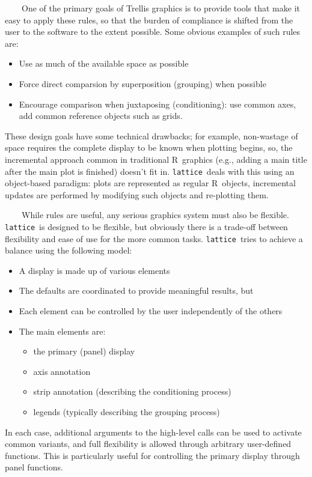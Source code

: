 \documentclass[10pt]{article}
\newcommand{\R}{\textsf{R}}
\newcommand{\code}[1]{\texttt{#1}}
\newcommand{\lattice}{\code{lattice}}
\begin{document}
~~~~One of the primary goals of Trellis graphics is to provide tools
that make it easy to apply these rules, so that the burden of
compliance is shifted from the user to the software to the extent
possible.  Some obvious examples of such rules are:
\begin{itemize}
\item Use as much of the available space as possible
\item Force direct comparsion by superposition (grouping) when
  possible
\item Encourage comparison when juxtaposing (conditioning): use common
  axes, add common reference objects such as grids.
\end{itemize}
These design goals have some technical drawbacks; for example,
non-wastage of space requires the complete display to be known when
plotting begins, so, the incremental approach common in traditional
\R\ graphics (e.g., adding a main title after the main plot is
finished) doesn't fit in.  \lattice\ deals with this using an
object-based paradigm: plots are represented as regular \R\ objects,
incremental updates are performed by modifying such objects and
re-plotting them.



~~~~While rules are useful, any serious graphics system must also be
flexible.  \lattice\ is designed to be flexible, but obviously there
is a trade-off between flexibility and ease of use for the more common
tasks.  \lattice\ tries to achieve a balance using the following
model:
\begin{itemize}
\item A display is made up of various elements
\item The defaults are coordinated to provide meaningful results, but
\item Each element can be controlled by the user independently of the
  others
\item The main elements are:
  \begin{itemize}
  \item the primary (panel) display
  \item axis annotation
  \item strip annotation (describing the conditioning process)
  \item legends (typically describing the grouping process)
  \end{itemize}
\end{itemize}
In each case, additional arguments to the high-level calls can be used
to activate common variants, and full flexibility is allowed through
arbitrary user-defined functions.  This is particularly useful for
controlling the primary display through panel functions.
\end{document}
